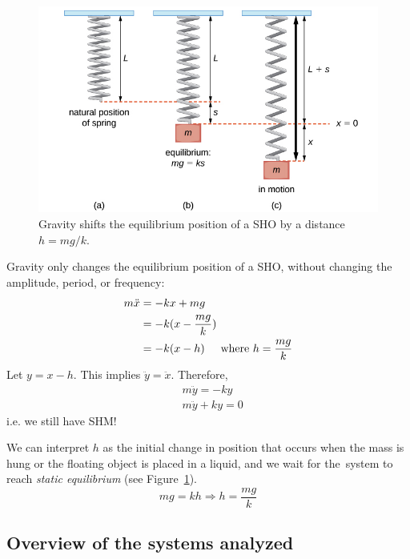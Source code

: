 \begin{figure}[h]
	\centering
	\includegraphics[scale=0.4]{phys232/Ch3-g-new-eqm} \caption{Gravity shifts the equilibrium position of a SHO by a distance $h=mg/k$.}\label{ch3:fig-g-new-eqm-pos}
\end{figure}

Gravity only changes the equilibrium position of a SHO, without changing the amplitude, period, or frequency:
\begin{align*}
	m\ddot{x} &= -kx + mg \\
	& = -k(x - \frac{mg}{k}) \\
	& = -k(x - h) \hspace{0.5cm}\text{where } h=\frac{mg}{k}
\end{align*}
Let $y=x-h$. This implies $\ddot{y} = \ddot{x}$. Therefore,
\begin{align*}
	&m\ddot{y} = -ky \\
	&m\ddot{y} + ky = 0 
\end{align*}
i.e. we still have SHM!

We can interpret $h$ as the initial change in position that occurs when the mass is hung or the floating object is placed in a liquid, and we wait for the system to reach \emph{static equilibrium} (see Figure~\ref{ch3:fig-g-new-eqm-pos}).
\[ mg = kh \Longrightarrow \boxed{h = \frac{mg}{k}} \]


\subsection{Overview of the systems analyzed}

